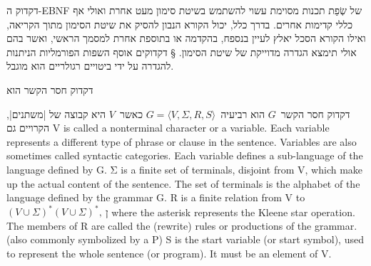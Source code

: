 דקדוק ה-EBNF של שְׂפַת תכנות מסוימת עשוי להשתמש בשיטת סימון מעט אחרת ואולי אף כללי
קדימות אחרים. בדרך כלל, יכול הקורא הנבון להסיק את שיטת הסימון מתוך הקריאה,
ואילו הקורא הסכל יאלץ לעיין בנספח, בהקדמה או בתוספת אחרת למסמך הראשי, ואשר בהם
אולי תימצא הגדרה מדוייקת של שיטת הסימון.
§ דקדוקים
אוסף השפות הפורמליות הניתנות להגדרה על ידי ביטויים רגולריים הוא מוגבל.

דקדוק חסר הקשר הוא

דקדוק חסר הקשר~$G$ הוא רביעיה~$G=⟨V,Σ,R,S⟩$
כאשר~$V$ היא קבוצה של \ע|משתנים|, הקרויים גם
V is called a nonterminal character or a variable. Each variable represents a
different type of phrase or clause in the sentence. Variables are also
sometimes called syntactic categories. Each variable defines a sub-language
of the language defined by G. Σ is a finite set of terminals, disjoint from
V, which make up the actual content of the sentence. The set of terminals is
the alphabet of the language defined by the grammar G.
R is a finite relation from V to~${\displaystyle (V∪Σ)^*}(V∪Σ)^*,~$ן where the
asterisk represents the Kleene star operation. The members of R are called
the (rewrite) rules or productions of the grammar. (also commonly symbolized
by a P) S is the start variable (or start symbol), used to represent the
whole sentence (or program). It must be an element of V.

\endinput
כוח ההבעה של ביטויים רגולריים הוא מוגבל. כך למשל, לא ניתן להביע באמצעות ביטוי
רגולרי את הדרישה שהסוגריים בתכנית מאוזנים. לפיכך, השימוש בביטויים רגולריים
מוגבל להגדרות פשוטות של אסימונים- אבני הבנין של השפה: משתנים, הערות,
מספרים וכו'.


ב
